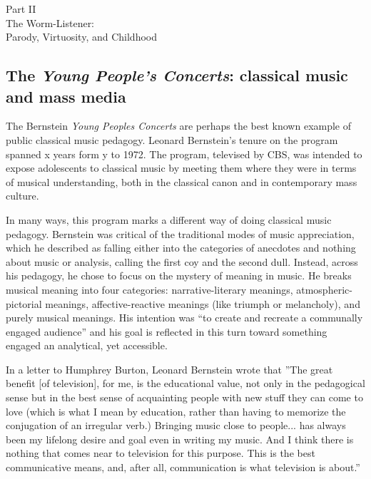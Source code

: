 \documentclass[12pt,letterpaper]{article}
\begin{document}
	\newpage
	\thispagestyle{empty}
	\vspace*{30pt}
	\begin{center}
	{\Huge Part II\\ 
	\Large The Worm-Listener:\\
	Parody, Virtuosity, and Childhood}
	\end{center}
	
	\newpage
	\subsection*{The \textit{Young People's Concerts}: classical music and 
	mass media}

	\noindent The Bernstein \textit{Young Peoples Concerts} are perhaps the
	best known example of public classical music pedagogy. Leonard 
	Bernstein's tenure
	on the program spanned x years form y to 1972. The program, televised by
	CBS, was intended to expose adolescents to classical music by meeting 
	them where they were in terms of musical understanding, both in the 
	classical canon and in contemporary mass culture.   

	In many ways, this program marks a different way of doing classical 
	music
	pedagogy. Bernstein was critical of the traditional modes of music 
	appreciation, which he described as falling either into the categories 
	of
	anecdotes and nothing about music or analysis, calling the first coy and
	the second dull. Instead, across his pedagogy, he chose to focus on the 
	mystery of meaning in music. He breaks musical meaning into four 
	categories: narrative-literary meanings, atmospheric-pictorial meanings,
	affective-reactive meanings (like triumph or melancholy), and purely 
	musical meanings.\autocite[14]{Kopfstein}  His intention
	was ``to create and recreate a communally engaged 
	audience''\autocite[51]{Kopfstein} and his goal is reflected in this
	turn toward something engaged an analytical, yet accessible.  
 	
	In a letter to Humphrey Burton, Leonard Bernstein wrote that ''The great
	benefit [of television], for me, is the educational value, not only in 
	the pedagogical sense but in the best sense of acquainting people with 
	new stuff they can come to love (which is what I mean by education, 
	rather than having to memorize the conjugation of an irregular verb.) 
	Bringing music close to people... has always been my lifelong desire and
	goal even in writing my music. And I think there is nothing that comes 
	near to television for this purpose. This is the best communicative 
	means, and, after all, communication is what television is 
	about.''\autocite[71]{Kopfstein}
\end{document}
